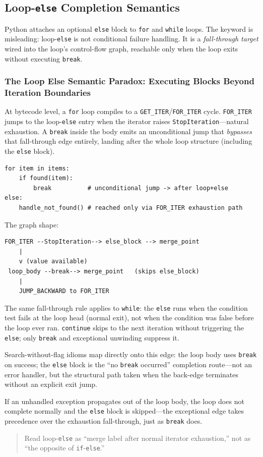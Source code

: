 \subsection{Loop-\texttt{else} Completion Semantics}

Python attaches an optional \texttt{else} block to \texttt{for} and \texttt{while} loops. The keyword is misleading: loop-\texttt{else} is not conditional failure handling. It is a \emph{fall-through target} wired into the loop's control-flow graph, reachable only when the loop exits without executing \texttt{break}.

\subsubsection{The Loop Else Semantic Paradox: Executing Blocks Beyond Iteration Boundaries}

At bytecode level, a \texttt{for} loop compiles to a \texttt{GET\_ITER}/\texttt{FOR\_ITER} cycle. \texttt{FOR\_ITER} jumps to the loop-\texttt{else} entry when the iterator raises \texttt{StopIteration}---natural exhaustion. A \texttt{break} inside the body emits an unconditional jump that \emph{bypasses} that fall-through edge entirely, landing after the whole loop structure (including the \texttt{else} block).

\begin{verbatim}
for item in items:
    if found(item):
        break          # unconditional jump -> after loop+else
else:
    handle_not_found() # reached only via FOR_ITER exhaustion path
\end{verbatim}

The graph shape:

\begin{verbatim}
FOR_ITER --StopIteration--> else_block --> merge_point
    |
    v (value available)
 loop_body --break--> merge_point   (skips else_block)
    |
    JUMP_BACKWARD to FOR_ITER
\end{verbatim}

The same fall-through rule applies to \texttt{while}: the \texttt{else} runs when the condition test fails at the loop head (normal exit), not when the condition was false before the loop ever ran. \texttt{continue} skips to the next iteration without triggering the \texttt{else}; only \texttt{break} and exceptional unwinding suppress it.

Search-without-flag idioms map directly onto this edge: the loop body uses \texttt{break} on success; the \texttt{else} block is the ``no \texttt{break} occurred'' completion route---not an error handler, but the structural path taken when the back-edge terminates without an explicit exit jump.

If an unhandled exception propagates out of the loop body, the loop does not complete normally and the \texttt{else} block is skipped---the exceptional edge takes precedence over the exhaustion fall-through, just as \texttt{break} does.

\begin{quote}
Read loop-\texttt{else} as ``merge label after normal iterator exhaustion,'' not as ``the opposite of \texttt{if}-\texttt{else}.''
\end{quote}
